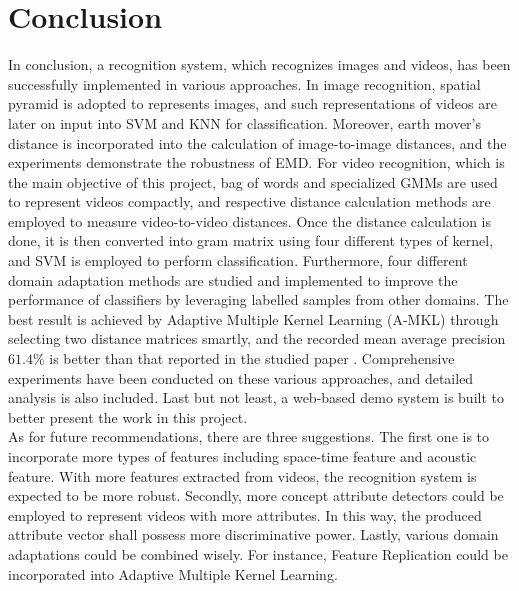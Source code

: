 \section{Conclusion}
In conclusion, a recognition system, which recognizes images and videos, has been successfully implemented in various approaches. In image recognition, spatial pyramid is adopted to represents images, and such representations of videos are later on input into SVM and KNN for classification. Moreover, earth mover's distance is incorporated into the calculation of image-to-image distances, and the experiments demonstrate the robustness of EMD. For video recognition, which is the main objective of this project, bag of words and specialized GMMs are used to represent videos compactly, and respective distance calculation methods are employed to measure video-to-video distances. Once the distance calculation is done, it is then converted into gram matrix using four different types of kernel, and SVM is employed to perform classification. Furthermore, four different domain adaptation methods are studied and implemented to improve the performance of classifiers by leveraging labelled samples from other domains. The best result is achieved by Adaptive Multiple Kernel Learning (A-MKL) through selecting two distance matrices smartly, and the recorded mean average precision $61.4\%$ is better than that reported in the studied paper \cite{duan2012visual}. Comprehensive experiments have been conducted on these various approaches, and detailed analysis is also included. Last but not least, a web-based demo system is built to better present the work in this project. \\

\noindent As for future recommendations, there are three suggestions. The first one is to incorporate more types of features including space-time feature and acoustic feature. With more features extracted from videos, the recognition system is expected to be more robust. Secondly, more concept attribute detectors could be employed to represent videos with more attributes. In this way, the produced attribute vector shall possess more discriminative power. Lastly, various domain adaptations could be combined wisely. For instance, Feature Replication could be incorporated into Adaptive Multiple Kernel Learning.  